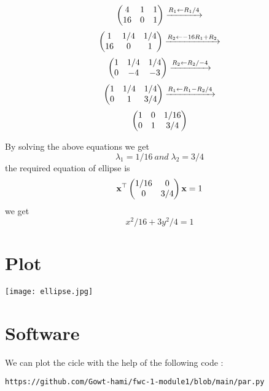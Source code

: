 \begin{center}            
\begin{align}       
\begin{pmatrix}4&1&1 \\16&0&1\end{pmatrix} \xrightarrow[]{R_1 \leftarrow R_1/4 } 
\end{align}
\begin{align}
\begin{pmatrix}1 & 1/4 & 1/4 \\16 & 0 & 1\end{pmatrix} \xrightarrow[]{R_2 \leftarrow -16R_1+R_2 } 
\end{align}
\begin{align}
\begin{pmatrix}1 & 1/4 & 1/4 \\0&-4&-3\end{pmatrix} \xrightarrow[]{R_2 \leftarrow  R_2/-4 }
\end{align}
\begin{align}
\begin{pmatrix}1&1/4&1/4 \\0 & 1 & 3/4 \end{pmatrix} \xrightarrow[]{R_1 \leftarrow R_1- R_2/4 }
\end{align}
\begin{align}
\begin{pmatrix}1&0&1/16 \\0 & 1 & 3/4  \end{pmatrix}
\end{align} 
\end{center}
By solving the above equations we get \\ 
\begin{equation}
{\lambda}_{1}=1/16\ and\; {\lambda}_{2}=3/4
\end{equation}
the required equation of ellipse is 
\begin{equation}
\textbf{x}^{\top}\begin{pmatrix}1/16&0\\0&3/4\end{pmatrix}\textbf{x}=1    
\end{equation} 
we get \begin{equation}
x^2/16+3y^2/4=1 
\end{equation}
 \section{Plot}
\texttt{[image: ellipse.jpg]}
  \section{Software}
  We can plot the cicle with the help of the following code :
 \vspace{3mm} 
\begin{lstlisting}
https://github.com/Gowt-hami/fwc-1-module1/blob/main/par.py
\end{lstlisting}

